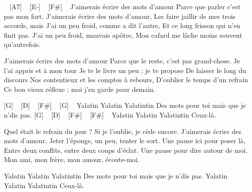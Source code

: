 

\begin{guitar}
[B-] ~ [A7] ~ [E-] ~ [F#] ~
J’aimerais écrire des mots d’amour
Parce que parler c’est pas mon fort.
J’aimerais écrire des mots d’amour,
Les faire jaillir de mes trois accords, mais
J’ai un peu froid, comme a dit l’autre,
Et ce long frisson qui n’en finit pas.
J’ai un peu froid, mauvais apôtre,
Mon cafard me lâche moins souvent qu’autrefois.

J’aimerais écrire des mots d’amour
Parce que le reste, c’est pas grand-chose.
Je l’ai appris et à mon tour
Je te le livre un peu ; je te propose
De laisser le long du discours
Nos contentieux et les comptes à rebours,
D’oublier le temps d’un refrain
Ce bon vieux réflexe ; moi j’en garde pour demain.

[G] ~ [D] ~ [F#] ~ [G] ~
Yalatin Yalatin Yalatintin
Des mots pour toi mais que je n’dis pas.
[G] ~ [D] ~ [F#] ~ [F#] ~
Yalatin Yalatin Yalatintin
Ceux-là.


Quel était le refrain du jour ?
Si je l’oublie, je cède encore.
J’aimerais écrire des mots d’amour,
Jeter l’éponge, un peu, tenter le sort.
Une pause ici pour poser là,
Entre deux conflits, entre deux coups d’éclat.
Une pause pour dire autour de moi,
Mon ami, mon frère, mon amour, écoute-moi.

Yalatin Yalatin Yalatintin
Des mots pour toi mais que je n’dis pas.
Yalatin Yalatin Yalatintin
Ceux-là. 
\end{guitar}